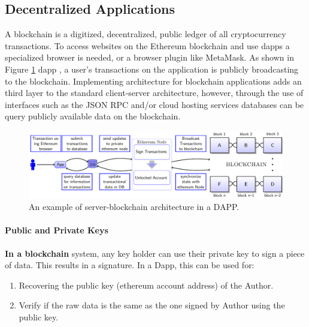 
\subsection{Decentralized Applications}
	A blockchain is a digitized, decentralized, public ledger of all cryptocurrency transactions. To access websites on the Ethereum blockchain and use dapps a specialized browser is needed, or a browser plugin like \gls{MetaMask}. As shown in 
	Figure \ref{fig:DApp} dapp \footnotemark, a user's transactions on the application is publicly broadcasting to the blockchain. 
	Implementing architecture for blockchain 
	applications \footnotemark adds an third layer to the standard client-server architecture, however, through the use of interfaces such as the JSON RPC and/or cloud hosting
	 services \footnotemark databases can be query publicly available data on the blockchain. 
	 
\begin{figure}[ht]
\begin{adjustbox}{center,max width=1.1\textwidth}
\includegraphics[width=1.2\linewidth]{Diagrams/blockchainInSimpleApp.pdf}
\end{adjustbox}
\caption{An example of server-blockchain architecture in a DAPP.}
\label{fig:DApp}
\end{figure}
\vspace*{-0.5cm}

\paragraph{Public and Private Keys}
 \textbf{In a blockchain} system, any key holder can use their private key to sign a piece of data. This results in a signature.
  In a Dapp, this can be used for:
 \begin{enumerate}
	\item Recovering the public key (ethereum account address) of the Author.
	\item Verify if the raw data is the same as the one signed by Author using the public key. 
\end{enumerate}
	
